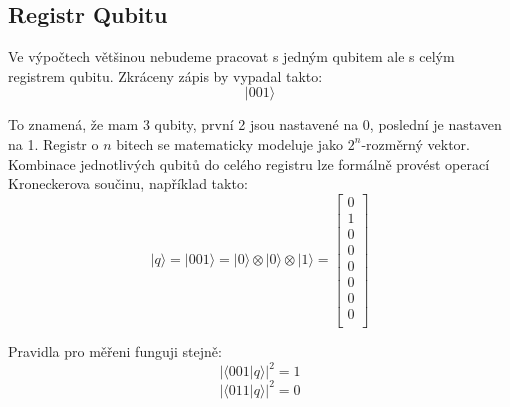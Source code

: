 \documentclass[11pt]{article}
\begin{document}
\subsection{Registr Qubitu}
Ve výpočtech většinou nebudeme pracovat s jedným qubitem ale s celým registrem qubitu. Zkráceny zápis by vypadal takto:
$$|001\rangle$$
\par To znamená, že mam 3 qubity, první 2 jsou nastavené na 0, poslední je nastaven na 1.
Registr o $n$ bitech se matematicky modeluje jako $2^n$-rozměrný vektor. Kombinace jednotlivých qubitů do celého registru lze formálně provést operací Kroneckerova součinu, například takto:
$$|q\rangle = |001\rangle = |0\rangle \otimes |0\rangle \otimes |1\rangle = \begin{bmatrix}
        0 \\
        1 \\
        0 \\
        0 \\
        0 \\
        0 \\
        0 \\
        0 \\
    \end{bmatrix}$$
\par Pravidla pro měřeni funguji stejně:
$$|\langle001|q\rangle|^2 = 1$$
$$|\langle 011|q\rangle|^2 = 0$$
\end{document}
